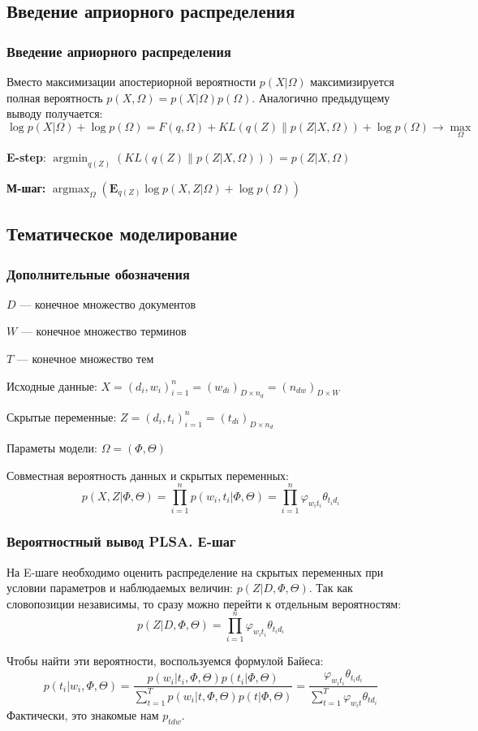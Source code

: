 \documentclass[utf8]{beamer}
\DeclareMathOperator{\argmax}{argmax}
\DeclareMathOperator{\argmin}{argmin}
\renewcommand{\phi}{\varphi}
\begin{document}
	\subsection{Введение априорного распределения}
	\begin{frame}	
	\frametitle{Введение априорного распределения}
	Вместо максимизации апостериорной вероятности $p(X|\Omega)$ максимизируется полная  вероятность $p(X, \Omega)= p(X|\Omega) p(\Omega)$. Аналогично предыдущему выводу получается:
\[
\log p(X|\Omega) + \log p(\Omega) = F(q, \Omega) + KL(q(Z)\|p(Z|X,\Omega)) + \log p(\Omega) \to \max\limits_{\Omega}
\]

\textbf{E-step}: $\argmin_{q(Z)} \left( KL(q(Z)\|p(Z|X,\Omega))\right) = p(Z|X, \Omega)$

\medskip

\textbf{М-шаг:} $\argmax_{\Omega} \left( \mathbf{E}_{q(Z)} \log p(X, Z|\Omega) + \log p(\Omega)\right)$ 
	\end{frame}


	\subsection{Тематическое моделирование}

 	\begin{frame}
		\frametitle{Дополнительные обозначения}  
$D$ --- конечное множество документов
\smallskip

$W$  --- конечное множество терминов
\smallskip

$T$ --- конечное множество тем
\smallskip

Исходные данные:
$X = (d_i ,w_i)_{i=1}^n = (w_{di})_{D \times n_d} = (n_{dw})_{D \times W}$
\smallskip

Скрытые переменные:
$Z = (d_i , t_i)_{i=1}^n = (t_{di})_{D \times n_d}$
\smallskip

Параметы модели:
$\Omega = (\Phi, \Theta)$
\smallskip

Совместная вероятность данных и скрытых переменных:
\[
p(X, Z|\Phi, \Theta) =\prod\limits_{i=1}^{n} p(w_{i}, t_{i}|\Phi, \Theta) =\prod\limits_{i=1}^{n} \phi_{w_{i}t_{i}}\theta_{t_{i}d_{i}}
\]
	\end{frame}

	
 	\begin{frame}
		\frametitle{Вероятностный вывод PLSA. Е-шаг}   
На E-шаге необходимо оценить распределение на скрытых переменных при условии параметров и  наблюдаемых величин: $p(Z|D,\Phi,\Theta)$. Так как словопозиции независимы, то сразу можно перейти к отдельным вероятностям:
\[
p(Z|D,\Phi, \Theta) = \prod\limits_{i=1}^{n} \phi_{w_{i}t_{i}}\theta_{t_{i}d_{i}}
\]

Чтобы найти эти вероятности, воспользуемся формулой Байеса:
\[
p(t_{i}|w_{i}, \Phi, \Theta) = \frac{p(w_{i}|t_{i}, \Phi, \Theta)p(t_{i}|\Phi,\Theta)}{\sum_{t=1}^T p(w_{i}|t, \Phi, \Theta)p(t|\Phi,\Theta)}
= \frac{\phi_{w_{i} t_{i}} \theta_{t_{i} d_i}}{\sum_{t=1}^T \phi_{w_{i}t} \theta_{td_i}}
\]
Фактически, это знакомые нам $p_{tdw}$.
	\end{frame}
	
\end{document}
